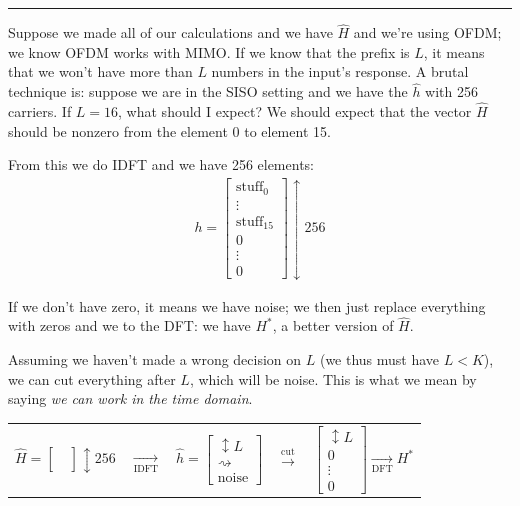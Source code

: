 \documentclass[a4paper, 12pt]{book}
\begin{document}
\hrule

Suppose we made all of our calculations and we have $\hat{H}$ and we're using OFDM; we know OFDM works with MIMO. If we know that the prefix is $L$, it means that we won't have more than $L$ numbers in the input's response.
A brutal technique is: suppose we are in the SISO setting and we have the $\hat{h}$ with 256 carriers. If $L=16$, what should I expect? We should expect that the vector $\hat{H}$ should be nonzero from the element 0 to element 15.

From this we do IDFT and we have 256 elements:
\begin{align*}
h = \begin{bmatrix}
\text{stuff}_0 \\
\vdots \\
\text{stuff}_{15} \\
0 \\
\vdots \\
0
\end{bmatrix} \updownarrow 256
\end{align*}

If we don't have zero, it means we have noise; we then just replace everything with zeros and we to the DFT: we have $H^*$, a better version of $\hat{H}$.

Assuming we haven't made a wrong decision on $L$ (we thus must have $L < K$), we can cut everything after $L$, which will be noise.
This is what we mean by saying \textit{we can work in the time domain}.

\clearpage

\begin{center}
\begin{tabular}{c c c c c}
$\hat{H} = \left[\begin{array}{c} \phantom{.} \\ \phantom{.} \\ \phantom{.} \end{array}\right] \updownarrow 256$ & 
$\xrightarrow[\text{IDFT}]{}$ & 
$\hat{h} = \left[\begin{array}{c} \updownarrow L \\ \rightsquigarrow \\ \text{noise} \end{array}\right]$ & 
$\xrightarrow{\text{cut}}$ & 
$\left[\begin{array}{c} \updownarrow L \\ 0 \\ \vdots \\ 0 \end{array}\right] \xrightarrow[\text{DFT}]{} H^*$ 
\end{tabular}
\end{center}
\end{document}
